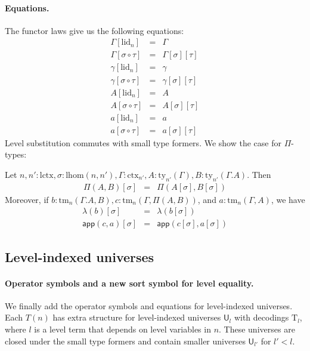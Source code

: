 \documentclass[submission,copyright,creativecommons]{eptcs}
\newcommand{\UU}{\mathsf{U}}
\newcommand{\app}[2]{{#1\,#2}} %
\def\lhom{\mathrm{lhom}}
\def\UU{\mathsf{U}}
\def\lctx{\mathrm{lctx}}
\def\lid{\mathrm{lid}}
\newcommand{\ctx}{\mathrm{ctx}}
\newcommand{\ty}{\mathrm{ty}}
\newcommand{\tm}{\mathrm{tm}}
\def\app{\mathsf{app}}
\newcommand{\Ta}{\mathrm{T}}
\begin{document}
\paragraph{Equations.}
The functor laws give us the following equations:
\begin{eqnarray*}
\Gamma[\lid_n] &=& \Gamma\\
\Gamma[\sigma \circ \tau] &=& \Gamma[\sigma][\tau]\\
\gamma[\lid_n] &=& \gamma\\
\gamma[\sigma \circ \tau] &=& \gamma[\sigma][\tau]\\
A[\lid_n] &=& A\\
A[\sigma \circ \tau] &=& A[\sigma][\tau]%
\\
a[\lid_n] &=& a\\
a[\sigma \circ \tau] &=& a[\sigma][\tau]%
\end{eqnarray*}
Level substitution commutes with small type formers. We show the case for $\Pi$-types:

Let $n, n' : \lctx , \sigma : \lhom(n,n'), \Gamma : \ctx_{n'}, A:\ty_{n'}(\Gamma), B:\ty_{n'}(\Gamma.A)$. Then
\begin{eqnarray*}
\Pi(A,B)[\sigma] &=& \Pi(A[\sigma],B[\sigma])
\end{eqnarray*}
Moreover, if $b : \tm_n(\Gamma.A,B), c :  \tm_n(\Gamma,\Pi(A,B))$,  and $a : \tm_n(\Gamma,A)$, we have
\begin{eqnarray*}
\lambda(b)[\sigma] &=&\lambda(b[\sigma])\\
\app(c,a)[\sigma] &=&\app(c[\sigma],a[\sigma])
\end{eqnarray*}

\subsection{Level-indexed universes}

\paragraph{Operator symbols and a new sort symbol for level equality.}
We finally add the operator symbols and equations for level-indexed universes.
Each $T(n)$ has extra structure for level-indexed universes $\UU_l$ with decodings $\Ta_l$, where $l$ is a level term that depends on level variables in $n$. These universes are closed under the small type formers and contain smaller universes $\UU_{l'}$ for $l' < l$.
\end{document}
